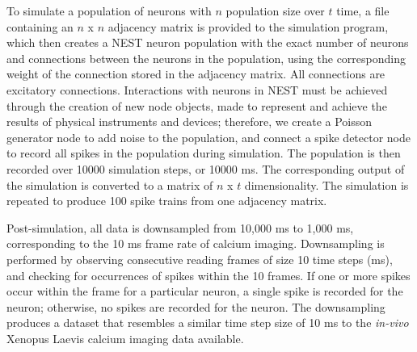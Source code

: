 \documentclass[11pt,titlepage]{article}
\begin{document}
To simulate a population of neurons with $n$ population size over $t$ time, a file containing an $n$ x $n$ adjacency matrix is provided to the simulation program, which then creates a NEST neuron population with the exact number of neurons and connections between the neurons in the population, using the corresponding weight of the connection stored in the adjacency matrix. All connections are excitatory connections. Interactions with neurons in NEST must be achieved through the creation of new node objects, made to represent and achieve the results of physical instruments and devices; therefore, we create a Poisson generator node to add noise to the population, and connect a spike detector node to record all spikes in the population during simulation. The population is then recorded over 10000 simulation steps, or 10000 ms. The corresponding output of the simulation is converted to a matrix of $n$ x $t$ dimensionality. The simulation is repeated to produce 100 spike trains from one adjacency matrix.\par
Post-simulation, all data is downsampled from 10,000 ms to 1,000 ms, corresponding to the 10 ms frame rate of calcium imaging. Downsampling is performed by observing consecutive reading frames of size 10 time steps (ms), and checking for occurrences of spikes within the 10 frames. If one or more spikes occur within the frame for a particular neuron, a single spike is recorded for the neuron; otherwise, no spikes are recorded for the neuron. The downsampling produces a dataset that resembles a similar time step size of 10 ms to the \textit{in-vivo} {Xenopus Laevis} calcium imaging data available.
\end{document}
